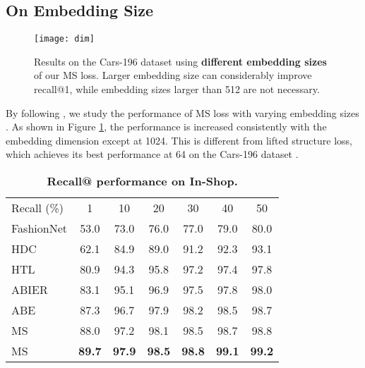 \documentclass[10pt,twocolumn,letterpaper]{article}
\newcommand{\tablestyle}[2]{\setlength{\tabcolsep}{#1}\renewcommand{\arraystretch}{#2}\centering\footnotesize}
\begin{document}
\subsection{On Embedding Size}
\begin{figure}[htp]
	\vspace{-10pt}
	\centering
	\texttt{[image: dim]}
	\caption{Results on the Cars-196 dataset using \textbf{different embedding sizes} of our MS loss. Larger embedding size can considerably improve recall@1, while embedding sizes larger than 512 are not necessary.}
	\label{fig-embeding-size}
\end{figure} 
By following \cite{semi-hard}, we study the performance of MS loss with varying embedding sizes . As shown in Figure \ref{fig-embeding-size}, the performance is increased consistently with the embedding dimension except at  1024. This is different from lifted structure loss, which achieves its best performance at 64 on the Cars-196 dataset  \cite{lifted-structured-loss}. 

\begin{table}[t]
    \tablestyle{7.5pt}{1.1}
	\begin{center}
		\begin{tabular}{l|cccccc}
			Recall (\%) & 1 & 10 & 20 & 30 & 40 & 50\\ \shline
			FashionNet \cite{DeepFashion}&53.0 & 73.0 & 76.0 & 77.0 & 79.0 & 80.0 \\
			HDC \cite{struct-clustering}& 62.1 & 84.9 & 89.0 & 91.2 & 92.3 & 93.1\\	 
			HTL \cite{HTL} & 80.9& 94.3& 95.8& 97.2& 97.4& 97.8\\\hline
			ABIER \cite{bier}  & 83.1 & 95.1 & 96.9 & 97.5 & 97.8 & 98.0\\	
			ABE \cite{Kim_2018_ECCV} & 87.3 & 96.7 & 97.9 & 98.2 & 98.5 & 98.7\\ 
			\hline
			{MS}  & 88.0& 97.2& 98.1& 98.5& 98.7& 98.8\\
			{MS}   &\bf89.7 &\bf97.9& \bf98.5& \bf98.8 & \bf99.1 & \bf99.2\\
		\end{tabular}
		\caption{\textbf{Recall@ performance on In-Shop.}}
		\label{Shop-table}
		\vspace{-10pt}
	\end{center}
\end{table}
\end{document}
